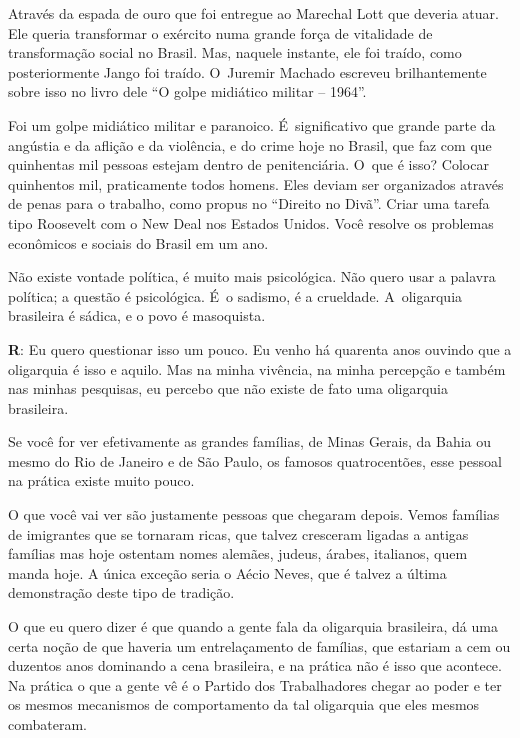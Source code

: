  

Através da espada de ouro que foi entregue ao Marechal Lott que deveria
atuar. Ele queria transformar o exército numa grande força de vitalidade
de transformação social no Brasil. Mas, naquele instante, ele foi traído,
como posteriormente Jango foi traído. O~Juremir Machado escreveu
brilhantemente sobre isso no livro dele ``O golpe midiático militar --
1964''.

 

Foi um golpe midiático militar e paranoico. É~significativo que grande
parte da angústia e da aflição e da violência, e do crime hoje no
Brasil, que faz com que quinhentas mil pessoas estejam dentro de
penitenciária. O~que é isso? Colocar quinhentos mil, praticamente todos
homens. Eles deviam ser organizados através de penas para o trabalho,
como propus no ``Direito no Divã''. Criar uma tarefa tipo Roosevelt com
o New Deal nos Estados Unidos. Você resolve os problemas econômicos e
sociais do Brasil em um ano.

 

Não existe vontade política, é muito mais psicológica. Não quero usar
a palavra política; a questão é psicológica. É~o sadismo, é
a crueldade. A~oligarquia brasileira é sádica, e o povo é masoquista.

 

\textbf{R}: Eu quero questionar isso um pouco. Eu venho há quarenta anos
ouvindo que a oligarquia é isso e aquilo. Mas na minha vivência, na
minha percepção e também nas minhas pesquisas, eu percebo que não existe
de fato uma oligarquia brasileira.

 

Se você for ver efetivamente as grandes famílias, de Minas Gerais, da
Bahia ou mesmo do Rio de Janeiro e de São Paulo, os famosos
quatrocentões, esse pessoal na prática existe muito pouco.

 

O que você vai ver são justamente pessoas que chegaram depois. Vemos
famílias de imigrantes que se tornaram ricas, que talvez cresceram
ligadas a antigas famílias mas hoje ostentam nomes alemães, judeus,
árabes, italianos, quem manda hoje. A única exceção seria o Aécio Neves,
que é talvez a última demonstração deste tipo de tradição.

 

O que eu quero dizer é que quando a gente fala da oligarquia
brasileira, dá uma certa noção de que haveria um entrelaçamento de
famílias, que estariam a cem ou duzentos anos dominando a cena
brasileira, e na prática não é isso que acontece. Na prática o que a
gente vê é o Partido dos Trabalhadores chegar ao poder e ter os mesmos
mecanismos de comportamento da tal oligarquia que eles mesmos
combateram.

